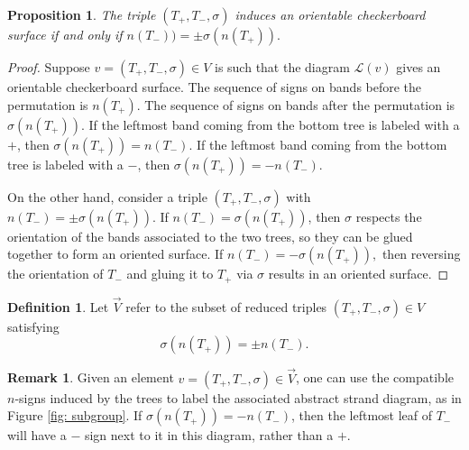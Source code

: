 \documentclass[11pt, twoside]{amsart}
\numberwithin{equation}{section}
\newtheorem{proposition}[theorem]{Proposition}
\theoremstyle{definition}
\newtheorem{definition}[theorem]{Definition}
\newtheorem{remark}[theorem]{Remark}
\numberwithin{equation}{section}
\begin{document}
\begin{proposition}
    The triple $(T_+,T_-,\sigma)$ induces an orientable checkerboard surface if and only if $n(T_-))=\pm \sigma(n(T_+)).$
\end{proposition}

\begin{proof} Suppose $v=(T_+,T_-,\sigma) \in V$ is such that the diagram $\mathscr{L}(v)$ gives an orientable checkerboard surface. The sequence of signs on bands before the permutation is $n(T_+)$. The sequence of signs on bands after the permutation is $\sigma(n(T_+))$. If the leftmost band coming from the bottom tree is labeled with a $+$, then $\sigma(n(T_+))=n(T_-)$. If the leftmost band coming from the bottom tree is labeled with a $-$, then $\sigma(n(T_+))=-n(T_-)$.

    On the other hand, consider a triple $(T_+,T_-,\sigma)$ with $n(T_-)=\pm \sigma(n(T_+)).$ If $n(T_-)=\sigma(n(T_+))$, then $\sigma$  respects the orientation of the bands associated to the two trees, so they can be glued together to form an oriented surface. If $n(T_-)=-\sigma(n(T_+)),$ then reversing the orientation of $T_-$ and gluing it to $T_+$ via $\sigma$ results in an oriented surface.
\end{proof}

\begin{definition}\label{def: or}
    Let $\vec{V}$ refer to the subset of reduced triples $(T_+,T_-,\sigma) \in V$ satisfying \[\sigma(n(T_+))=\pm n(T_-).\]
\end{definition}

\begin{remark}\label{rem: signs}Given an element $v=(T_+,T_-,\sigma)\in \vec{V}$, one can use the compatible $n$-signs induced by the trees to label the associated abstract strand diagram, as in Figure \ref{fig: subgroup}. If $\sigma(n(T_+))=-n(T_-)$, then the leftmost leaf of $T_-$ will have a $-$ sign next to it in this diagram, rather than a $+$.\end{remark}
\end{document}
